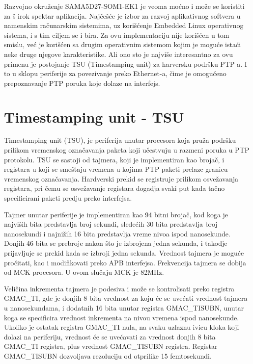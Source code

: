 \documentclass[a4paper,12pt, master]{etf}
\begin{document}
	Razvojno okru\v{z}enje SAMA5D27-SOM1-EK1 je veoma mo\'{c}no i mo\v{z}e se koristiti za \v{s}
	irok spektar aplikacija. Naj\v{c}e\v{s}\'{c}e je izbor za razvoj aplikativnog softvera u
	namenskim ra\v{c}unarskim sistemima, uz kori\v{s}\'{c}enje Embedded Linux operativnog
	sistema, i s tim ciljem se i bira. Za ovu implementaciju nije kori\v{s}\'{c}en u tom smislu,
	ve\'{c} je kori\v{s}\'{c}en sa drugim operativnim sistemom kojim je mogu\'{c}e ista\'{c}i
	neke druge njegove karakteristike. Ali ono sto je najvi\v{s}e interesantno za ovu primenu je
	postojanje TSU (Timestamping unit) za harversku podr\v{s}ku PTP-a. I to u sklopu periferije
        za povezivanje preko Ethernet-a, \v{c}ime je omogu\'{c}eno prepoznavanje PTP poruka koje dolaze
	na interfejs.

	\section{Timestamping unit - TSU}
        Timestamping unit (TSU), je periferija unutar procesora koja pru\v{z}a
        podr\v{s}ku prilikom vremenskog ozna\v{c}avanja paketa koji
        u\v{c}estvuju u razmeni poruka u PTP protokolu. TSU se sastoji od
        tajmera, koji je implementiran kao broja\v{c}, i registara u koji se
        sme\v{s}taju vremena u kojima PTP paketi prelaze granicu vremenskog
        ozna\v{c}avanja. Hardverski prekid se registruje prilikom
        osve\v{z}avanja registara, pri \v{c}emu se osve\v{z}avanje registara
        dogadja svaki put kada ta\v{c}no specificirani paketi predju preko
        interfejsa.

        Tajmer unutar periferije je implementiran kao 94 bitni broja\v{c}, kod
        koga je najvi\v{s}ih bita predstavlja broj sekundi, slede\'{c}ih 30
        bita predstavlja broj nanosekundi i najni\v{z}ih 16 bita predstavlja
        vreme nivoa ispod nanosekunde. Donjih 46 bita se prebroje nakon \v{s}to
        je izbrojena jedna sekunda, i takodje prijavljuje se prekid kada se
        izbroji jedna sekunda. Vrednost tajmera je mogu\'{c}e pro\v{c}itati,
        kao i modifikovati preko APB interfejsa. Frekvencija tajmera se dobija
        od MCK procesora. U ovom slu\v{c}aju MCK je 82MHz.

        Veli\v{c}ina inkrementa tajmera je podesiva i mo\v{z}e se kontrolisati
        preko registra GMAC\_TI, gde je donjih 8 bita vrednost za koju \'{c}e
        se uve\'{c}ati vrednost tajmera u nanosekundama, i dodatnih 16 bita
        unutar registra GMAC\_TISUBN, unutar koga se specificira vrednost
        inkrementa na nivou vremena ispod nanosekunde. Ukoliko je ostatak
        registra GMAC\_TI nula, na svaku uzlaznu ivicu kloka koji dolazi na
        periferiju, vrednost \'{c}e se uve\'{c}avati za vrednost donjih 8 bita
        GMAC\_TI registra, plus vrednost GMAC\_TISUBN registra. Registar
        GMAC\_TISUBN dozvoljava rezoluciju od otprilike 15 femtosekundi.
\end{document}
